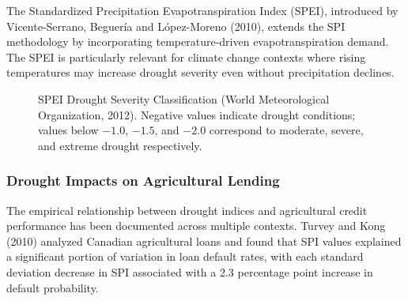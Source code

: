 \documentclass[12pt,a4paper]{article}
\begin{document}
The Standardized Precipitation Evapotranspiration Index (SPEI), introduced by Vicente-Serrano, Beguer\'ia and L\'opez-Moreno (2010), extends the SPI methodology by incorporating temperature-driven evapotranspiration demand. The SPEI is particularly relevant for climate change contexts where rising temperatures may increase drought severity even without precipitation declines.

\begin{figure}[H]
\centering
{}
\caption{SPEI Drought Severity Classification (World Meteorological Organization, 2012). Negative values indicate drought conditions; values below $-1.0$, $-1.5$, and $-2.0$ correspond to moderate, severe, and extreme drought respectively.}
\label{fig:spei_classification}
\end{figure}

\subsubsection{Drought Impacts on Agricultural Lending}

The empirical relationship between drought indices and agricultural credit performance has been documented across multiple contexts. Turvey and Kong (2010) analyzed Canadian agricultural loans and found that SPI values explained a significant portion of variation in loan default rates, with each standard deviation decrease in SPI associated with a 2.3 percentage point increase in default probability.
\end{document}

